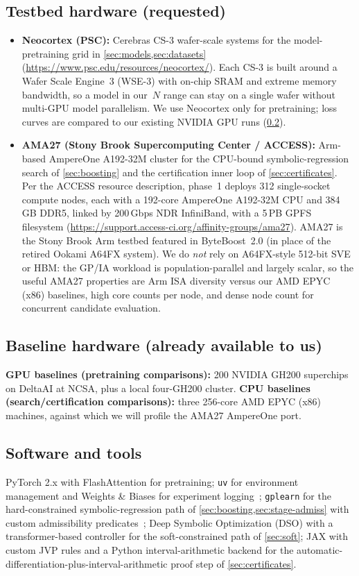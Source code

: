 \documentclass[11pt]{article}
\begin{document}
\subsection{Testbed hardware (requested)}\label{sec:testbeds}
\begin{itemize}[nosep, leftmargin=1.4em]
 \item \textbf{Neocortex (PSC):} Cerebras CS-3 wafer-scale systems for the model-pretraining grid in \cref{sec:models,sec:datasets}
 (\url{https://www.psc.edu/resources/neocortex/}).
 Each CS-3 is built around a Wafer Scale Engine~3 (WSE-3) with on-chip SRAM and extreme memory bandwidth, so a model in our~$N$ range can stay on a single wafer without multi-GPU model parallelism.
 We use Neocortex only for pretraining; loss curves are compared to our existing NVIDIA GPU runs (\cref{sec:baselines}).
 \item \textbf{AMA27 (Stony Brook Supercomputing Center / ACCESS):} Arm-based AmpereOne A192-32M cluster for the CPU-bound symbolic-regression search of \cref{sec:boosting} and the certification inner loop of \cref{sec:certificates}.
 Per the ACCESS resource description, phase~1 deploys 312 single-socket compute nodes, each with a 192-core AmpereOne A192-32M CPU and 384\,GB DDR5, linked by 200\,Gbps NDR InfiniBand, with a 5\,PB GPFS filesystem (\url{https://support.access-ci.org/affinity-groups/ama27}).
 AMA27 is the Stony Brook Arm testbed featured in ByteBoost~2.0 (in place of the retired Ookami A64FX system).
 We do \emph{not} rely on A64FX-style 512-bit SVE or HBM: the GP/IA workload is population-parallel and largely scalar, so the useful AMA27 properties are Arm ISA diversity versus our AMD EPYC (x86) baselines, high core counts per node, and dense node count for concurrent candidate evaluation.
\end{itemize}

\subsection{Baseline hardware (already available to us)}\label{sec:baselines}
\textbf{GPU baselines (pretraining comparisons):} 200 NVIDIA GH200 superchips on DeltaAI at NCSA, plus a local four-GH200 cluster.
\textbf{CPU baselines (search/certification comparisons):} three 256-core AMD EPYC (x86) machines, against which we will profile the AMA27 AmpereOne port.

\subsection{Software and tools}\label{sec:software}
PyTorch 2.x with FlashAttention for pretraining; \texttt{uv} for environment management and Weights \& Biases for experiment logging~\citep{biewald2020wandb}; \texttt{gplearn} for the hard-constrained symbolic-regression path of \cref{sec:boosting,sec:stage-admiss} with custom admissibility predicates~\citep{stephens2015gplearn}; Deep Symbolic Optimization (DSO) with a transformer-based controller for the soft-constrained path of \cref{sec:soft}; JAX with custom JVP rules and a Python interval-arithmetic backend for the automatic-differentiation-plus-interval-arithmetic proof step of \cref{sec:certificates}.
\end{document}
